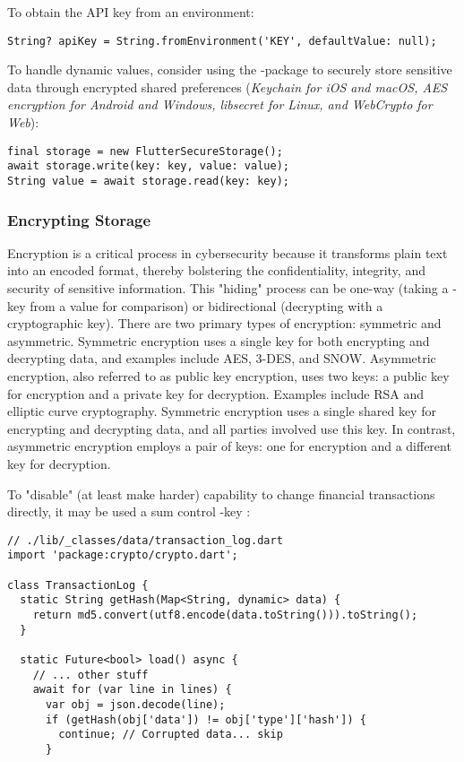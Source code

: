 \noindent To obtain the API key from an environment:

\begin{lstlisting}
String? apiKey = String.fromEnvironment('KEY', defaultValue: null);
\end{lstlisting}

\noindent To handle dynamic values, consider using the -package to securely store sensitive 
data through encrypted shared preferences (\emph{Keychain for iOS and macOS, AES encryption for Android and Windows, 
libsecret for Linux, and WebCrypto for Web}):

\begin{lstlisting}
final storage = new FlutterSecureStorage();
await storage.write(key: key, value: value);
String value = await storage.read(key: key);
\end{lstlisting}


\subsubsection{Encrypting Storage}

Encryption is a critical process in cybersecurity because it transforms plain text into an encoded format, thereby 
bolstering the confidentiality, integrity, and security of sensitive information. This "hiding" process can be one-way 
(taking a -key from a value for comparison) or bidirectional (decrypting with a cryptographic key). There are 
two primary types of encryption: symmetric and asymmetric. Symmetric encryption uses a single key for both encrypting 
and decrypting data, and examples include AES, 3-DES, and SNOW. Asymmetric encryption, also referred to as public key 
encryption, uses two keys: a public key for encryption and a private key for decryption. Examples include RSA and 
elliptic curve cryptography. Symmetric encryption uses a single shared key for encrypting and decrypting data, and all 
parties involved use this key. In contrast, asymmetric encryption employs a pair of keys: one for encryption and a 
different key for decryption.

To "disable" (at least make harder) capability to change financial transactions directly, it may be used a sum control 
-key :

\begin{lstlisting}
// ./lib/_classes/data/transaction_log.dart
import 'package:crypto/crypto.dart';

class TransactionLog {
  static String getHash(Map<String, dynamic> data) {
    return md5.convert(utf8.encode(data.toString())).toString();
  }

  static Future<bool> load() async {
    // ... other stuff
    await for (var line in lines) {
      var obj = json.decode(line);
      if (getHash(obj['data']) != obj['type']['hash']) {
        continue; // Corrupted data... skip
      }
\end{lstlisting}

